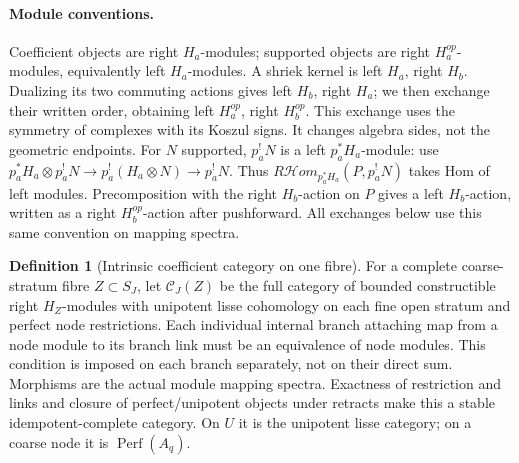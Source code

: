 \documentclass[11pt]{article}
\theoremstyle{definition}
\newtheorem{definition}[proposition]{Definition}
\theoremstyle{remark}
\newcommand{\Perf}{\operatorname{Perf}}
\begin{document}
\paragraph{Module conventions.}
Coefficient objects are right $H_a$-modules; supported objects are
right $H_a^{op}$-modules, equivalently left $H_a$-modules.  A shriek
kernel is left $H_a$, right $H_b$.  Dualizing its two commuting
actions gives left $H_b$, right $H_a$; we then exchange their written
order, obtaining left $H_a^{op}$, right $H_b^{op}$.  This exchange
uses the symmetry of complexes with its Koszul signs.  It changes
algebra sides, not the geometric endpoints.  For $N$ supported,
$p_a^!N$ is a left $p_a^*H_a$-module: use
$p_a^*H_a\otimes p_a^!N\to p_a^!(H_a\otimes N)\to p_a^!N$.
Thus $R\mathcal Hom_{p_a^*H_a}(P,p_a^!N)$ takes Hom of left modules.
Precomposition with the right $H_b$-action on $P$ gives a left
$H_b$-action, written as a right $H_b^{op}$-action after pushforward.
All exchanges below use this same convention on mapping spectra.

\begin{definition}[Intrinsic coefficient category on one fibre]
\label{def:intrinsic-fibre}
For a complete coarse-stratum fibre $Z\subset S_J$, let
$\mathcal C_J(Z)$ be the full category of bounded constructible right
$H_Z$-modules with unipotent lisse cohomology on each fine open
stratum and perfect node restrictions.  Each individual internal
branch attaching map from a node module to its branch link must be
an equivalence of node modules.  This condition is imposed on each
branch separately, not on their direct sum.  Morphisms are the
actual module mapping spectra.  Exactness of restriction and links
and closure of perfect/unipotent objects under retracts make this a
stable idempotent-complete category.  On $U$ it is the unipotent
lisse category; on a coarse node it is $\Perf(A_q)$.
\end{definition}
\end{document}
